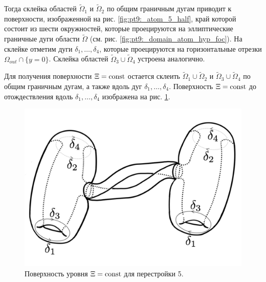 Тогда склейка областей $\widetilde{\Omega}_1$ и $\widetilde{\Omega}_2$ по общим граничным дугам приводит к поверхности, изображенной на рис. \ref{fig:pt9:_atom_5_half}, край которой состоит из шести окружностей, которые проецируются на эллиптические граничные дуги области $\widetilde{\Omega}$ (см. рис. \ref{fig:pt9:_domain_atom_hyp_foc}). На склейке отметим дуги  $\delta_1, \ldots, \delta_4$, которые проецируются на горизонтальные отрезки $\Omega_{out} \cap \{y=0\}$.
Склейка областей $\widetilde{\Omega}_3 \cup \widetilde{\Omega}_4$ устроена аналогично. 

Для получения поверхности $\Xi = \mathrm{const}$ остается склеить $\widetilde{\Omega}_1 \cup \widetilde{\Omega}_2$ и $\widetilde{\Omega}_3 \cup \widetilde{\Omega}_4$ по общим граничным дугам, а также вдоль дуг $\delta_1, \ldots, \delta_4$. Поверхность $\Xi = \mathrm{const}$ до отождествления вдоль  $\delta_1, \ldots, \delta_4$ изображена на рис. \ref{fig:pt9:_atom_5}.

\begin{figure}[!htb]
\centering
\includegraphics[scale=0.125]{images/ch4/section2/atoms/atom_5.pdf}
    \caption{Поверхность уровня $\Xi = \mathrm{const}$ для перестройки 5.}
    \label{fig:pt9:_atom_5}
\end{figure}



